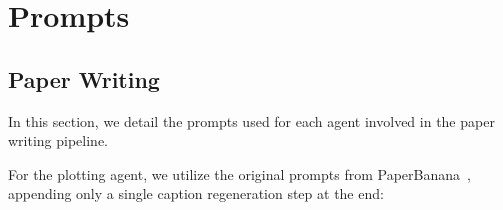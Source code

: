 \section{Prompts}
\label{appendix:prompts}


\subsection{Paper Writing}
\label{appendix:paper_writing_prompts}
In this section, we detail the prompts used for each agent involved in the paper writing pipeline.


\begin{paperpromptbox}

\end{paperpromptbox}


For the plotting agent, we utilize the original prompts from PaperBanana~\citep{zhu2026paperbanana}, appending only a single caption regeneration step at the end:

\begin{paperpromptbox}

\end{paperpromptbox}


\begin{paperpromptbox}

\end{paperpromptbox}

\begin{paperpromptbox}

\end{paperpromptbox}


